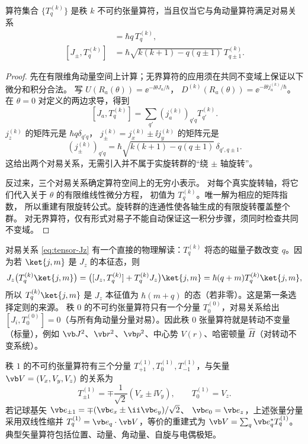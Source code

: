 \begin{proposition}
算符集合 $\{T^{(k)}_q\}$ 是秩 $k$ 不可约张量算符，当且仅当它与角动量算符满足对易关系
\begin{align}
[J_z,T^{(k)}_q]&=\hbar q\,T^{(k)}_q,\label{eq:tensor-Jz}\\
[J_\pm,T^{(k)}_q]&=\hbar\sqrt{k(k+1)-q(q\pm1)}\,T^{(k)}_{q\pm1}.\label{eq:tensor-Jpm}
\end{align}
\end{proposition}
\begin{proof}
先在有限维角动量空间上计算；无界算符的应用须在共同不变域上保证以下微分和积分合法。
写 $U(R_a(\theta))=\ee^{-\ii\theta J_a/\hbar}$，
$D^{(k)}(R_a(\theta))=\ee^{-\ii\theta j_a^{(k)}/\hbar}$。
在 $\theta=0$ 对定义的两边求导，得到
\[
[J_a,T_q^{(k)}]=\sum_{q'}(j_a^{(k)})_{q'q}T_{q'}^{(k)}.
\]
$j_z^{(k)}$ 的矩阵元是 $\hbar q\delta_{q'q}$，
$j_\pm^{(k)}=j_x^{(k)}\pm\ii j_y^{(k)}$ 的矩阵元是
\[
(j_\pm^{(k)})_{q'q}
=\hbar\sqrt{k(k+1)-q(q\pm1)}\,\delta_{q',q\pm1}.
\]
这给出两个对易关系，无需引入并不属于实旋转群的“绕 $\pm$ 轴旋转”。

反过来，三个对易关系确定算符空间上的无穷小表示。
对每个真实旋转轴，将它们代入关于 $\theta$ 的有限维线性微分方程，
初值为 $T_q^{(k)}$。唯一解为相应的矩阵指数，
所以重建有限旋转公式。旋转群的连通性使各轴生成的有限旋转覆盖整个群。
对无界算符，仅有形式对易子不能自动保证这一积分步骤，须同时检查共同不变域。
\end{proof}
对易关系 \cref{eq:tensor-Jz} 有一个直接的物理解读：$T^{(k)}_q$ 将态的磁量子数改变 $q$。因为若 $\ket{j,m}$ 是 $J_z$ 的本征态，则
\[
J_z\bigl(T^{(k)}_q\ket{j,m}\bigr)
=\bigl([J_z,T^{(k)}_q]+T^{(k)}_qJ_z\bigr)\ket{j,m}
=\hbar(q+m)T^{(k)}_q\ket{j,m},
\]
所以 $T^{(k)}_q\ket{j,m}$ 是 $J_z$ 本征值为 $\hbar(m+q)$ 的态（若非零）。这是第一条选择定则的来源。
秩 $0$ 的不可约张量算符只有一个分量 $T^{(0)}_0$，对易关系给出 $[J_i,T^{(0)}_0]=0$（与所有角动量分量对易）。因此秩 $0$ 张量算符就是转动不变量（标量），例如 $\vb J^2$、$\vb r^2$、$\vb p^2$、中心势 $V(r)$、哈密顿量 $\hat H$（对转动不变系统）。

秩 $1$ 的不可约张量算符有三个分量 $T^{(1)}_{+1},T^{(1)}_0,T^{(1)}_{-1}$，与矢量 $\vb V=(V_x,V_y,V_z)$ 的关系为
\[
T^{(1)}_{\pm1}=\mp\frac{1}{\sqrt2}(V_x\pm\ii V_y),\qquad T^{(1)}_0=V_z.
\]
若记球基矢 $\vb e_{\pm1}=\mp(\vb e_x\pm\ii\vb e_y)/\sqrt2$、
$\vb e_0=\vb e_z$，上述张量分量采用双线性缩并
$T^{(1)}_q=\vb e_q\cdot\vb V$，等价的重建式为
$\vb V=\sum_q\vb e_q^*T^{(1)}_q$。
典型矢量算符包括位置、动量、角动量、自旋与电偶极矩。

